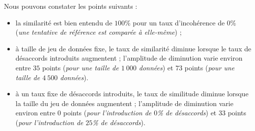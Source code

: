 			Nous pouvons constater les points suivants :
			\begin{itemize}
				\item la similarité est bien entendu de $100$\% pour un taux d'incohérence de $0$\% (\textit{une tentative de référence est comparée à elle-même}) ;
				\item à taille de jeu de données fixe, le taux de similarité diminue lorsque le taux de désaccords introduits augmentent ;
				l'amplitude de diminution varie environ entre $35$ points (\textit{pour une taille de $1~000$ données}) et $73$ points (\textit{pour une taille de $4~500$ données}).
				\item à un taux fixe de désaccords introduits, le taux de similitude diminue lorsque la taille du jeu de données augmentent ;
				l'amplitude de diminution varie environ entre $0$ points (\textit{pour l'introduction de $0$\% de désaccords}) et $33$ points (\textit{pour l'introduction de $25$\% de désaccords}).
			\end{itemize}
			
